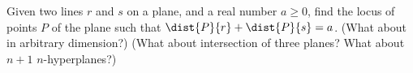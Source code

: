 Given two lines $r$ and $s$ on a plane,
and a real number $a \geq 0$,
find the locus of points $P$ of the plane
such that $\dist{P}{r} + \dist{P}{s} = a$.
\newline
(What about in arbitrary dimension?)
(What about intersection of three planes?
What about $n + 1$ $n$-hyperplanes?)
